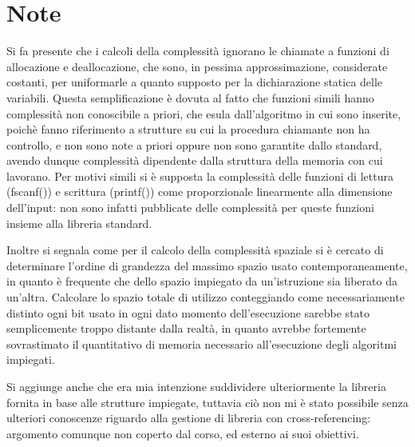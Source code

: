 \documentclass[a4paper,11pt]{Article}
\begin{document}
\section{Note}
Si fa presente che i calcoli della complessità ignorano le chiamate a funzioni di allocazione e deallocazione, che sono, in pessima approssimazione, considerate costanti, per uniformarle a quanto supposto per la dichiarazione statica delle variabili. Questa semplificazione è dovuta al fatto che funzioni simili hanno complessità non conoscibile a priori, che esula dall'algoritmo in cui sono inserite, poichè fanno riferimento a strutture su cui la procedura chiamante non ha controllo, e non sono note a priori oppure non sono garantite dallo standard, avendo dunque complessità dipendente dalla struttura della memoria con cui lavorano.
Per motivi simili si è supposta la complessità delle funzioni di lettura (fscanf()) e scrittura (printf()) come proporzionale linearmente alla dimensione dell'input: non sono infatti pubblicate delle complessità per queste funzioni insieme alla libreria standard.

Inoltre si segnala come per il calcolo della complessità spaziale si è cercato di determinare l'ordine di grandezza del massimo spazio usato contemporaneamente, in quanto è frequente che dello spazio impiegato da un'istruzione sia liberato da un'altra. Calcolare lo spazio totale di utilizzo conteggiando come necessariamente distinto ogni bit usato in ogni dato momento dell'esecuzione sarebbe stato semplicemente troppo distante dalla realtà, in quanto avrebbe fortemente sovrastimato il quantitativo di memoria necessario all'esecuzione degli algoritmi impiegati.

Si aggiunge anche che era mia intenzione suddividere ulteriormente la libreria fornita in base alle strutture impiegate, tuttavia ciò non mi è stato possibile senza ulteriori conoscenze riguardo alla gestione di libreria con cross-referencing: argomento comunque non coperto dal corso, ed esterno ai suoi obiettivi.
\end{document}
